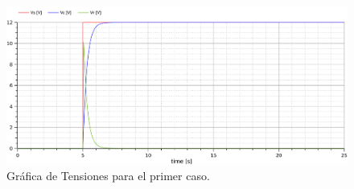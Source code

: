 \begin{figure}[H]
  \centering
  \includegraphics[width=\textwidth]{modelica/graficas/1-tensiones}
  \caption{Gráfica de Tensiones para el primer caso.}
  \label{gr:caso1:tensiones}
\end{figure}
